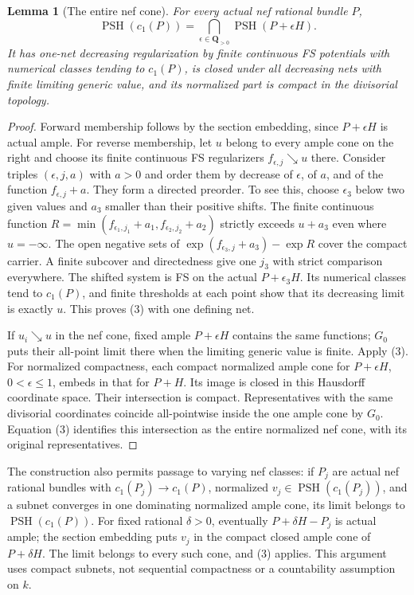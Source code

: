 \documentclass[11pt]{article}
\newcommand{\PSH}{\operatorname{PSH}}
\newtheorem{lemma}[theorem]{Lemma}
\begin{document}
\begin{lemma}[The entire nef cone]
For every actual nef rational bundle $P$,
\[
 \PSH(c_1(P))=\bigcap_{\epsilon\in\mathbf Q_{>0}}
                      \PSH(P+\epsilon H).                  \tag{3}
\]
It has one-net decreasing regularization by finite continuous FS
potentials with numerical classes tending to $c_1(P)$, is closed
under all decreasing nets with finite limiting generic value, and
its normalized part is compact in the divisorial topology.
\end{lemma}
\begin{proof}
Forward membership follows by the section embedding, since
$P+\epsilon H$ is actual ample. For reverse membership, let $u$
belong to every ample cone on the right and choose its finite
continuous FS regularizers $f_{\epsilon,j}\searrow u$ there.
Consider triples $(\epsilon,j,a)$ with $a>0$ and order them by
decrease of $\epsilon$, of $a$, and of the function
$f_{\epsilon,j}+a$. They form a directed preorder. To see this,
choose $\epsilon_3$ below two given values and $a_3$ smaller than
their positive shifts. The finite continuous function
$R=\min(f_{\epsilon_1,j_1}+a_1,f_{\epsilon_2,j_2}+a_2)$
strictly exceeds $u+a_3$ even where $u=-\infty$.
The open negative sets of
$\exp(f_{\epsilon_3,j}+a_3)-\exp R$ cover the compact carrier.
A finite subcover and directedness give one $j_3$ with strict
comparison everywhere. The shifted system is FS on the actual
$P+\epsilon_3H$. Its numerical classes tend to $c_1(P)$, and
finite thresholds at each point show that its decreasing limit
is exactly $u$. This proves (3) with one defining net.

If $u_i\searrow u$ in the nef cone, fixed ample $P+\epsilon H$
contains the same functions; $G_0$ puts their all-point limit
there when the limiting generic value is finite. Apply (3).
For normalized compactness, each compact normalized ample cone
for $P+\epsilon H$, $0<\epsilon\leq1$, embeds in that for
$P+H$. Its image is closed in this Hausdorff coordinate space.
Their intersection is compact. Representatives with the same
divisorial coordinates coincide all-pointwise inside the one ample
cone by $G_0$. Equation (3) identifies this intersection as the
entire normalized nef cone, with its original representatives.
\end{proof}
The construction also permits passage to varying nef classes:
if $P_j$ are actual nef rational bundles with $c_1(P_j)\to c_1(P)$,
normalized $v_j\in\PSH(c_1(P_j))$, and a subnet converges in one
dominating normalized ample cone, its limit belongs to
$\PSH(c_1(P))$. For fixed rational $\delta>0$, eventually
$P+\delta H-P_j$ is actual ample; the section embedding puts
$v_j$ in the compact closed ample cone of $P+\delta H$.
The limit belongs to every such cone, and (3) applies. This argument
uses compact subnets, not sequential compactness or a countability
assumption on $k$.
\end{document}
